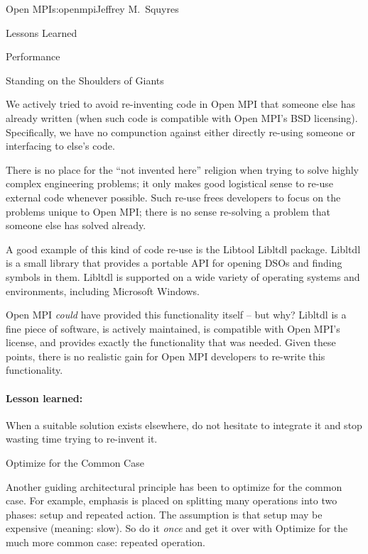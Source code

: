 \begin{aosachapter}{Open MPI}{s:openmpi}{Jeffrey M.\ Squyres}
\begin{aosasect1}{Lessons Learned}
\begin{aosasect2}{Performance}
\end{aosasect2}


\begin{aosasect2}{Standing on the Shoulders of Giants}

We actively tried to avoid re-inventing code in Open MPI that someone
else has already written (when such code is compatible with Open
MPI's BSD licensing).
%
Specifically, we have no compunction against either directly re-using
someone or interfacing to else's code.

There is no place for the ``not invented here'' religion when trying
to solve highly complex engineering problems; it only makes good
logistical sense to re-use external code whenever possible.
%
Such re-use frees developers to focus on the problems unique to Open
MPI; there is no sense re-solving a problem that someone else has
solved already.

A good example of this kind of code re-use is the Libtool Libltdl
package.  Libltdl is a small library that provides a portable API for
opening DSOs and finding symbols in them.  Libltdl is supported on a
wide variety of operating systems and environments, including
Microsoft Windows.

Open MPI {\em could} have provided this functionality itself -- but
why?
%
Libltdl is a fine piece of software, is actively maintained, is
compatible with Open MPI's license, and provides exactly the
functionality that was needed.
%
Given these points, there is no realistic gain for Open MPI developers
to re-write this functionality.


\paragraph{Lesson learned:} 

When a suitable solution exists elsewhere, do not hesitate to integrate
it and stop wasting time trying to re-invent it.

\end{aosasect2}


\begin{aosasect2}{Optimize for the Common Case}

Another guiding architectural principle has been to optimize for the
common case.  
% 
For example, emphasis is placed on splitting many operations into two
phases: setup and repeated action.  The assumption is that setup may
be expensive (meaning: slow).  So do it {\em once} and get it over
with
%
Optimize for the much more common case: repeated operation.


\end{aosasect2}
\end{aosasect1}
\end{aosachapter}
